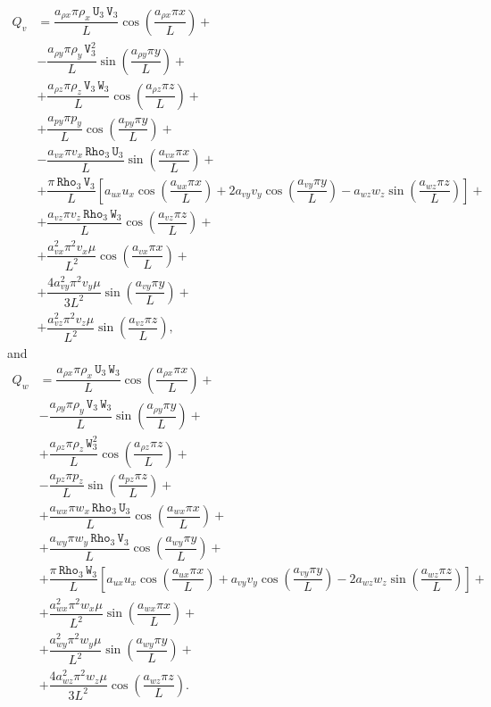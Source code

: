\documentclass[10pt]{article}
\newcommand{\Rho}{\,\mathtt{Rho}}
\newcommand{\U}{\,\mathtt{U}}
\newcommand{\V}{\,\mathtt{V}}
\newcommand{\W}{\,\mathtt{W}}
\begin{document}
\begin{equation}
 \begin{split}
Q_v &= \dfrac{a_{\rho x} \pi \rho_x \U_3 \V_3 }{L}\cos\left(\dfrac{a_{\rho x} \pi x}{L}\right)+\\
&-\dfrac{a_{\rho y} \pi \rho_y \V_3^2 }{L}\sin\left(\dfrac{a_{\rho y} \pi y}{L}\right)+\\
&+\dfrac{a_{\rho z} \pi \rho_z \V_3 \W_3 }{L}\cos\left(\dfrac{a_{\rho z}\pi z }{L}\right)+\\
&+\dfrac{a_{py} \pi p_y }{L}\cos\left(\dfrac{a_{py} \pi y}{L}\right)+\\
&-\dfrac{a_{vx} \pi v_x \Rho_3 \U_3 }{L}\sin\left(\dfrac{a_{vx} \pi x}{L}\right)+\\
&+\dfrac{\pi \Rho_3 \V_3}{L}\left[a_{ux} u_x \cos\left(\dfrac{a_{ux} \pi x}{L}\right)+2 a_{vy} v_y \cos\left(\dfrac{a_{vy} \pi y}{L}\right)-a_{wz} w_z \sin\left(\dfrac{a_{wz}\pi z }{L}\right)\right]+\\
&+\dfrac{a_{vz} \pi v_z \Rho_3 \W_3 }{L}\cos\left(\dfrac{a_{vz}\pi z }{L}\right)+\\
&+\dfrac{a_{vx}^2 \pi^2 v_x \mu }{L^2}\cos\left(\dfrac{a_{vx} \pi x}{L}\right) +\\
&+\dfrac{4a_{vy}^2 \pi^2 v_y \mu  }{3L^2}\sin\left(\dfrac{a_{vy} \pi y}{L}\right) +\\
&+\dfrac{a_{vz}^2 \pi^2 v_z \mu }{L^2}\sin\left(\dfrac{a_{vz} \pi z}{L}\right) ,
 \end{split}
\end{equation}
and
\begin{equation}
 \begin{split}
Q_w &= \dfrac{a_{\rho x} \pi \rho_x \U_3 \W_3}{L} \cos\left(\dfrac{a_{\rho x} \pi x}{L}\right)+\\
&-\dfrac{a_{\rho y} \pi \rho_y \V_3 \W_3 }{L}\sin\left(\dfrac{a_{\rho y} \pi y}{L}\right)+\\
&+\dfrac{a_{\rho z} \pi \rho_z \W_3^2 }{L}\cos\left(\dfrac{a_{\rho z}\pi z }{L}\right)+\\
&-\dfrac{a_{pz} \pi p_z }{L}\sin\left(\dfrac{a_{pz}\pi z }{L}\right)+\\
&+\dfrac{a_{wx} \pi w_x \Rho_3 \U_3 }{L}\cos\left(\dfrac{a_{wx} \pi x}{L}\right)+\\
&+\dfrac{a_{wy} \pi w_y \Rho_3 \V_3}{L}\cos\left(\dfrac{a_{wy} \pi y}{L}\right) +\\
&+\dfrac{\pi \Rho_3 \W_3}{L}\left[a_{ux} u_x \cos\left(\dfrac{a_{ux} \pi x}{L}\right)+a_{vy} v_y \cos\left(\dfrac{a_{vy} \pi y}{L}\right)-2 a_{wz} w_z \sin\left(\dfrac{a_{wz}\pi z }{L}\right)\right]+\\
&+\dfrac{a_{wx}^2 \pi^2 w_x \mu }{L^2}\sin\left(\dfrac{a_{wx} \pi x}{L}\right) +\\
&+\dfrac{a_{wy}^2 \pi^2 w_y \mu }{L^2}\sin\left(\dfrac{a_{wy} \pi y}{L}\right) +\\
&+\dfrac{4 a_{wz}^2 \pi^2 w_z \mu }{3L^2}\cos\left(\dfrac{a_{wz} \pi z}{L}\right) .
 \end{split}
\end{equation}
\end{document}
